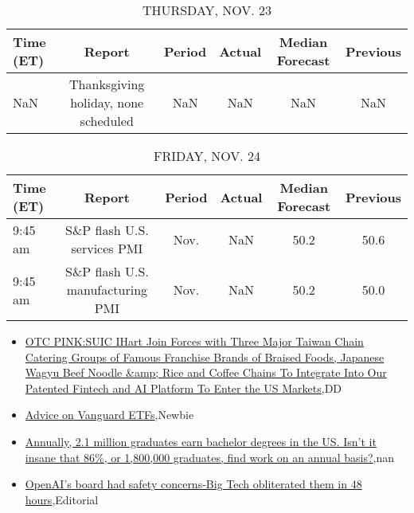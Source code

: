 \documentclass{article}%
\begin{document}
%


\begin{table}[htbp]%
\caption{THURSDAY, NOV. 23}%
\centering%
\begin{adjustbox}{width=1\textwidth}%
\begin{tabular}{lccccc}
\toprule
Time (ET) &                               Report & Period & Actual & Median Forecast & Previous \\
\midrule
      NaN & Thanksgiving holiday, none scheduled &    NaN &    NaN &             NaN &      NaN \\
\bottomrule
\end{tabular}
%
\end{adjustbox}%
\end{table}

%


\begin{table}[htbp]%
\caption{FRIDAY, NOV. 24}%
\centering%
\begin{adjustbox}{width=1\textwidth}%
\begin{tabular}{lccccc}
\toprule
Time (ET) &                           Report & Period & Actual & Median Forecast & Previous \\
\midrule
  9:45 am &      S\&P flash U.S. services PMI &   Nov. &    NaN &            50.2 &     50.6 \\
  9:45 am & S\&P flash U.S. manufacturing PMI &   Nov. &    NaN &            50.2 &     50.0 \\
\bottomrule
\end{tabular}
%
\end{adjustbox}%
\end{table}

%
\begin{itemize}%
\item%
\href{https://reddit.com/r/Baystreetbets/comments/180f6k0/otc\_pinksuic\_ihart\_join\_forces\_with\_three\_major/}{OTC PINK:SUIC IHart Join Forces with Three Major Taiwan Chain Catering Groups of Famous Franchise Brands of Braised Foods, Japanese Wagyu Beef Noodle \&amp; Rice and Coffee Chains To Integrate Into Our Patented Fintech and AI Platform To Enter the US Markets},DD%
\item%
\href{https://reddit.com/r/StockMarket/comments/17zumgn/advice\_on\_vanguard\_etfs/}{Advice on Vanguard ETFs},Newbie%
\item%
\href{https://reddit.com/r/Economics/comments/1809pal/annually\_21\_million\_graduates\_earn\_bachelor/}{Annually, 2.1 million graduates earn bachelor degrees in the US. Isn't it insane that 86\%, or 1,800,000 graduates, find work on an annual basis?},nan%
\item%
\href{https://reddit.com/r/Economics/comments/1808un9/openais\_board\_had\_safety\_concernsbig\_tech/}{OpenAI's board had safety concerns-Big Tech obliterated them in 48 hours},Editorial%
\end{itemize}%
\end{document}
